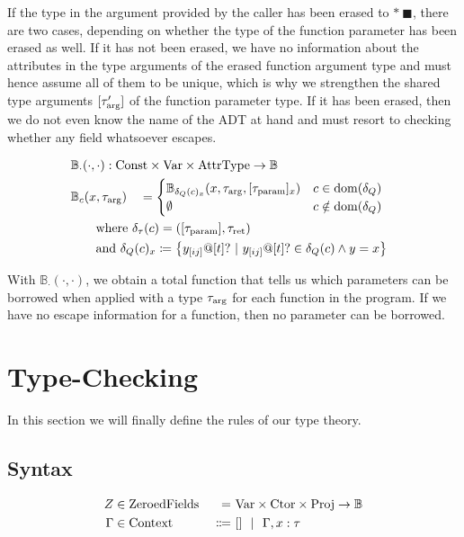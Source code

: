 If the type in the argument provided by the caller has been erased to $*\ \blacksquare$, there are two cases, depending on whether the type of the function parameter has been erased as well. If it has not been erased, we have no information about the attributes in the type arguments of the erased function argument type and must hence assume all of them to be unique, which is why we strengthen the shared type arguments $[\tau_{\mathrm{arg}}']$ of the function parameter type. If it has been erased, then we do not even know the name of the ADT at hand and must resort to checking whether any field whatsoever escapes.

\begin{alignat*}{3}
	&\mathbb{B}_\cdot(\cdot, \cdot) : \mathrlap{\Const \times \Var \times \AttrType \to \mathbb{B}} \\
	&\mathbb{B}_c(x, \tau_\arrg) &&= \begin{cases}
		\mathbb{B}_{\delta_Q(c)_x}(x, \tau_\arrg, [\tau_\param]_x) & c \in \dom(\delta_Q) \\
		\emptyset & c \notin \dom(\delta_Q)
	\end{cases}\\
	&\rebreak{\text{where}\ \delta_\tau(c) = ([\tau_\param], \tau_\ret)} \\
	&\rebreak{\text{and}\ \delta_Q(c)_x \coloneqq \left\{y_{[ij]}@[t]? \ |\ y_{[ij]}@[t]? \in \delta_Q(c) \land y = x \right\}}
\end{alignat*}

With $\mathbb{B}_\cdot(\cdot, \cdot)$, we obtain a total function that tells us which parameters can be borrowed when applied with a type $\tau_{\mathrm{arg}}$ for each function in the program. If we have no escape information for a function, then no parameter can be borrowed.

\section{Type-Checking}\label{sec:checking}

In this section we will finally define the rules of our type theory.

\subsection{Syntax}
\newcommand{\ZeroedFields}{\mathrm{ZeroedFields}}
\newcommand{\Context}{\mathrm{Context}}
\begin{alignat*}{3}
	Z &\in \ZeroedFields\ &=&\ \Var \times \Ctor \times \Proj \to \mathbb{B} \\
	\Gamma &\in \Context  &\Coloneqq&\ [] \sep \Gamma, x : \tau
\end{alignat*}

